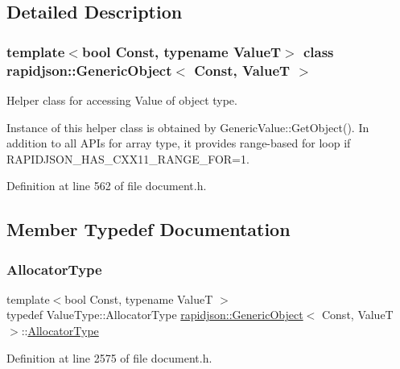 \subsection{Detailed Description}
\subsubsection*{template$<$bool Const, typename ValueT$>$\newline
class rapidjson\+::\+Generic\+Object$<$ Const, Value\+T $>$}

Helper class for accessing Value of object type. 

Instance of this helper class is obtained by {\ttfamily Generic\+Value\+::\+Get\+Object()}. In addition to all A\+P\+Is for array type, it provides range-\/based for loop if {\ttfamily R\+A\+P\+I\+D\+J\+S\+O\+N\+\_\+\+H\+A\+S\+\_\+\+C\+X\+X11\+\_\+\+R\+A\+N\+G\+E\+\_\+\+F\+OR=1}. 

Definition at line 562 of file document.\+h.



\subsection{Member Typedef Documentation}
\mbox{\label{classrapidjson_1_1_generic_object_ae30003e248368737382eed69ec8fe1eb}} 
\subsubsection{\texorpdfstring{AllocatorType}{AllocatorType}}
{\footnotesize\ttfamily template$<$bool Const, typename ValueT $>$ \\
typedef Value\+Type\+::\+Allocator\+Type \mbox{\hyperlink{classrapidjson_1_1_generic_object}{rapidjson\+::\+Generic\+Object}}$<$ Const, ValueT $>$\+::\mbox{\hyperlink{classrapidjson_1_1_generic_object_ae30003e248368737382eed69ec8fe1eb}{Allocator\+Type}}}



Definition at line 2575 of file document.\+h.

\mbox{\label{classrapidjson_1_1_generic_object_a947f543afbdd5e6d1c5b2dd1fe5a6e60}} 
